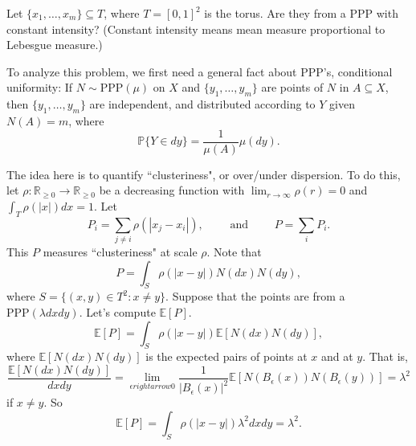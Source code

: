 \documentclass[12pt]{article}
\theoremstyle{plain}
\begin{document}
 Let $\{x_1,\ldots,x_m\} \subseteq T$, where $T = [0,1]^2$ is the torus. Are they from a PPP with constant intensity? (Constant intensity means mean measure proportional to Lebesgue measure.)

To analyze this problem, we first need a general fact about PPP's, conditional uniformity: If $N \sim \text{PPP}(\mu)$ on $X$ and $\{y_1,\ldots, y_m\}$ are points of $N$ in $A \subseteq X$, then $\{y_1,\ldots,y_m\}$ are independent, and distributed according to $Y$ given $N(A) = m$, where 
\[
\mathbb{P}\{Y \in dy\} = \frac{1}{\mu(A)} \mu(dy).
\] 


The idea here is to quantify ``clusteriness", or over/under dispersion. To do this, let $\rho: \mathbb{R}_{\geq 0} \rightarrow \mathbb{R}_{\geq 0}$ be a decreasing function with $\lim_{r \rightarrow \infty} \rho(r) = 0$ and $\int_T \rho(|x|) dx = 1$. Let
\[
P_i = \sum_{j \neq i} \rho(|x_j - x_i|), \quad \quad \text{ and } \quad \quad P = \sum_i P_i.
\]
This $P$ measures ``clusteriness" at scale $\rho$. Note that
\[
P = \int_S \rho(|x - y|) N(dx)N(dy),
\]
where $S = \{(x,y) \in T^2: x \neq y\}$. Suppose that the points are from a $\text{PPP}(\lambda dx dy)$. Let's compute $\mathbb{E}[P]$.
\[
\mathbb{E}[P] = \int_S \rho(|x - y|) \mathbb{E}[N(dx)N(dy)],
\]
where $\mathbb{E}[N(dx)N(dy)]$ is the expected pairs of points at $x$ and at $y$. That is,
\[
\frac{\mathbb{E}[N(dx)N(dy)]}{dxdy} = \lim_{\epsilon rightarrow 0} \frac{1}{|B_{\epsilon}(x)|^2} \mathbb{E}[N(B_{\epsilon}(x)) N(B_{\epsilon}(y))] = \lambda^2
\]
if $x \neq y$. So
\[
\mathbb{E}[P] = \int_S \rho(|x - y|) \lambda^2 dx dy = \lambda^2.
\]
\end{document}
